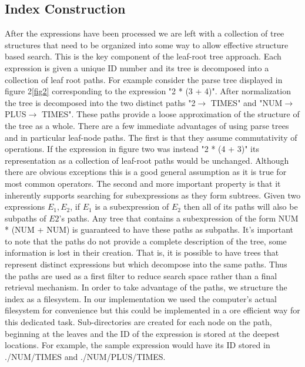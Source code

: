 \documentclass{sig-alternate}
\begin{document}
\subsection{Index Construction}
After the expressions have been processed we are left with a collection of tree structures that need to be organized into some way to allow effective structure based search. This is the key component of the leaf-root tree approach. Each expression is given a unique ID number and its tree is decomposed into a collection of leaf root paths. For example consider the parse tree displayed in figure 2\ref{fig2} corresponding to the expression "2 * (3 + 4)". After normalization the tree is decomposed into the two distinct paths "2$\rightarrow$ TIMES" and "NUM$\rightarrow$ PLUS$\rightarrow$ TIMES". These paths provide a loose approximation of the structure of the tree as a whole. 
There are a few immediate advantages of using parse trees and in particular leaf-node paths. The first is that they assume commutativity of operations. If the expression in figure two was instead "2 * (4 + 3)" its representation as a collection of leaf-root paths would be unchanged. Although there are obvious exceptions this is a good general assumption as it is true for most common operators.
The second and more important property is that it inherently supports searching for subexpressions as they
form subtrees. Given two expressions $E_1, E_2$, if $E_1$ is a subexpression of $E_2$ then all of its
paths will also be subpaths of $E2$'s paths. Any tree that contains a subexpression of the form NUM * (NUM + NUM) is guaranteed to have these paths as subpaths. 
It's important to note that the paths do not provide a complete description of the tree, some information is lost in their creation. That is, it is possible to have trees that represent distinct expressions but which decompose into the same paths. Thus the paths are used as a first filter to reduce search space rather than a final retrieval mechanism. In order to take advantage of the paths, we structure the index as a filesystem. In our implementation we used the computer's actual filesystem for convenience but this could be implemented in a ore efficient way for this dedicated task. Sub-directories are created for each node on the path, beginning at the leaves and the ID of the expression is stored at the deepest locations. For example, the sample expression would have its ID stored in ./NUM/TIMES and ./NUM/PLUS/TIMES. 
\end{document}
